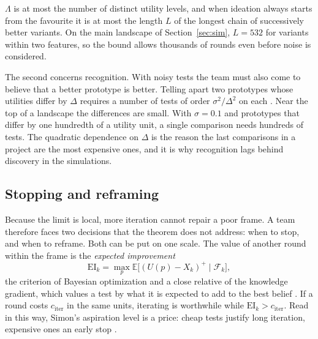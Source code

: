 \documentclass[10pt,twocolumn]{article}
\newcommand{\E}{\mathbb{E}}
\newcommand{\filt}{\mathcal{F}}
\theoremstyle{definition}
\begin{document}
$\Lambda$ is at most the number of distinct utility levels, and when ideation always starts from the favourite it is at most the length $L$ of the longest chain of successively better variants. On the main landscape of Section~\ref{sec:sim}, $L=532$ for variants within two features, so the bound allows thousands of rounds even before noise is considered.

The second concerns recognition. With noisy tests the team must also come to believe that a better prototype is better. Telling apart two prototypes whose utilities differ by $\Delta$ requires a number of tests of order $\sigma^2/\Delta^2$ on each \citep{evendar2006, mannor2004}. Near the top of a landscape the differences are small. With $\sigma=0.1$ and prototypes that differ by one hundredth of a utility unit, a single comparison needs hundreds of tests. The quadratic dependence on $\Delta$ is the reason the last comparisons in a project are the most expensive ones, and it is why recognition lags behind discovery in the simulations.

\subsection{Stopping and reframing}
\label{sec:reframe}

Because the limit is local, more iteration cannot repair a poor frame. A team therefore faces two decisions that the theorem does not address: when to stop, and when to reframe. Both can be put on one scale. The value of another round within the frame is the \emph{expected improvement}
\begin{equation}
\label{eq:ei}
\mathrm{EI}_k=\max_p\E\big[(U(p)-X_k)^+\mid\filt_k\big],
\end{equation}
the criterion of Bayesian optimization \citep{jones1998} and a close relative of the knowledge gradient, which values a test by what it is expected to add to the best belief \citep{frazier2008}. If a round costs $c_{\mathrm{iter}}$ in the same units, iterating is worthwhile while $\mathrm{EI}_k>c_{\mathrm{iter}}$. Read in this way, Simon's aspiration level is a price: cheap tests justify long iteration, expensive ones an early stop \citep{simon1956}.
\end{document}

